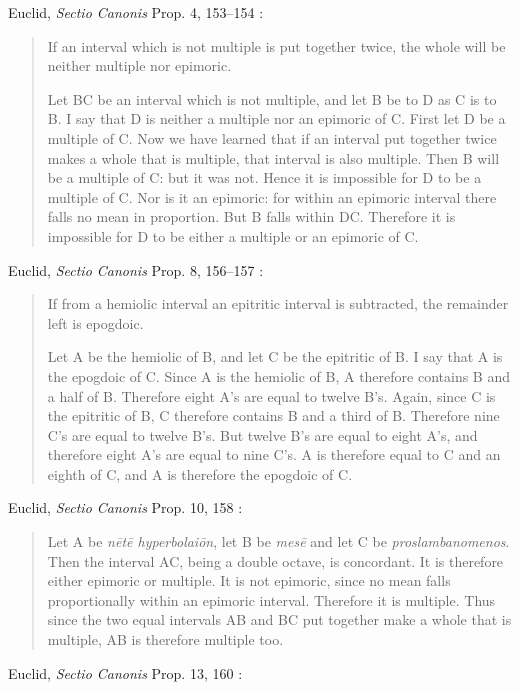 \documentclass{article}
\theoremstyle{definition}
\begin{document}
Euclid, {\em Sectio Canonis} Prop. 4, 153--154 \cite[p.~196]{barker}:

\begin{quote}
If an interval which is not multiple is put together
twice, the whole will be neither multiple nor epimoric.

Let BC be an interval which is not multiple, and let B be to D as C is to B. I
say that D is neither a multiple nor an epimoric of C. First let D be a multiple
of C. Now we have learned that if an interval put together twice makes a whole
that is multiple, that interval is also multiple. Then B will be a multiple of C:
but it was not. Hence it is impossible for D to be a multiple of C. Nor is it an
epimoric: for within an epimoric interval there falls no mean in proportion.
But B falls within DC. Therefore it is impossible for D to be either a multiple
or an epimoric of C.
\end{quote}

Euclid, {\em Sectio Canonis} Prop. 8, 156--157 \cite[p.~198]{barker}:

\begin{quote}
If from a hemiolic interval an epitritic interval is
subtracted, the remainder left is epogdoic.

Let A be the hemiolic of B, and let C be the epitritic of B.
I say that A is the epogdoic of C. Since A is the hemiolic
of B, A therefore contains B and a half of B. Therefore
eight A's are equal to twelve B's. Again, since C is the
epitritic of B, C therefore contains B and a third of B.
Therefore nine C's are equal to twelve B's. But twelve B's
are equal to eight A's, and therefore eight A's are equal to
nine C's. A is therefore equal to C and an eighth of C, and
A is therefore the epogdoic of C.
\end{quote}

Euclid, {\em Sectio Canonis} Prop. 10, 158 \cite[p.~199]{barker}:

\begin{quote}
Let A be {\em n\={e}t\={e} hyperbolai\={o}n}, let B be {\em mes\={e}} and let C be {\em proslambanomenos}.
Then the interval AC, being a double octave, is concordant. It is therefore
either epimoric or multiple. It is not epimoric, since no mean falls
proportionally within an epimoric interval. Therefore it is multiple. Thus
since the two equal intervals AB and BC put together make a whole that is
multiple, AB is therefore multiple too.
\end{quote}

Euclid, {\em Sectio Canonis} Prop. 13, 160 \cite[p.~201]{barker}:
\end{document}
